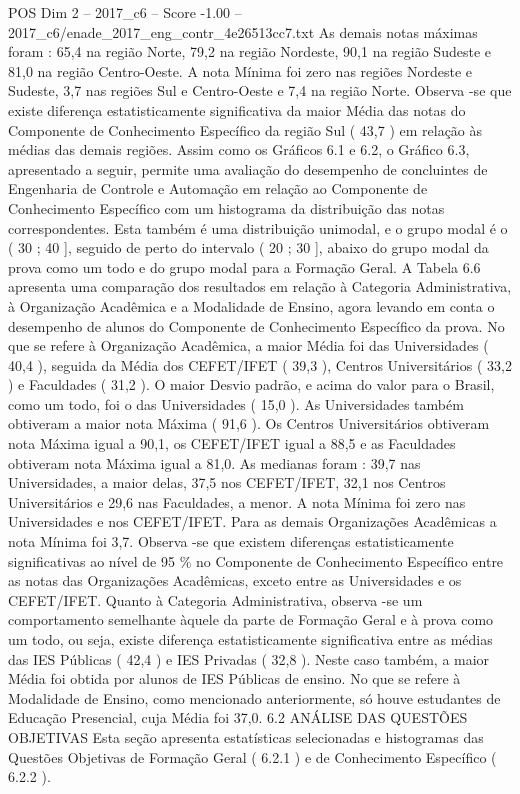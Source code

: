 \begin{textsample}{POS Dim 2 – 2017\_c6 – Score -1.00 – 2017\_c6/enade\_2017\_eng\_contr\_4e26513cc7.txt}
As demais notas máximas foram : 65,4 na região Norte, 79,2 na região Nordeste, 90,1 na região Sudeste e 81,0 na região Centro-Oeste.
A nota Mínima foi zero nas regiões Nordeste e Sudeste, 3,7 nas regiões Sul e Centro-Oeste e 7,4 na região Norte.
Observa -se que existe diferença estatisticamente significativa da maior Média das notas do Componente de Conhecimento Específico da região Sul ( 43,7 ) em relação às médias das demais regiões.
Assim como os Gráficos 6.1 e 6.2, o Gráfico 6.3, apresentado a seguir, permite uma avaliação do desempenho de concluintes de Engenharia de Controle e Automação em relação ao Componente de Conhecimento Específico com um histograma da distribuição das notas correspondentes.
Esta também é uma distribuição unimodal, e o grupo modal é o ( 30 ; 40 ], seguido de perto do intervalo ( 20 ; 30 ], abaixo do grupo modal da prova como um todo e do grupo modal para a Formação Geral.
A Tabela 6.6 apresenta uma comparação dos resultados em relação à Categoria Administrativa, à Organização Acadêmica e a Modalidade de Ensino, agora levando em conta o desempenho de alunos do Componente de Conhecimento Específico da prova.
No que se refere à Organização Acadêmica, a maior Média foi das Universidades ( 40,4 ), seguida da Média dos CEFET/IFET ( 39,3 ), Centros Universitários ( 33,2 ) e Faculdades ( 31,2 ).
O maior Desvio padrão, e acima do valor para o Brasil, como um todo, foi o das Universidades ( 15,0 ).
As Universidades também obtiveram a maior nota Máxima ( 91,6 ).
Os Centros Universitários obtiveram nota Máxima igual a 90,1, os CEFET/IFET igual a 88,5 e as Faculdades obtiveram nota Máxima igual a 81,0.
As medianas foram : 39,7 nas Universidades, a maior delas, 37,5 nos CEFET/IFET, 32,1 nos Centros Universitários e 29,6 nas Faculdades, a menor.
A nota Mínima foi zero nas Universidades e nos CEFET/IFET.
Para as demais Organizações Acadêmicas a nota Mínima foi 3,7.
Observa -se que existem diferenças estatisticamente significativas ao nível de 95 \% no Componente de Conhecimento Específico entre as notas das Organizações Acadêmicas, exceto entre as Universidades e os CEFET/IFET.
Quanto à Categoria Administrativa, observa -se um comportamento semelhante àquele da parte de Formação Geral e à prova como um todo, ou seja, existe diferença estatisticamente significativa entre as médias das IES Públicas ( 42,4 ) e IES Privadas ( 32,8 ).
Neste caso também, a maior Média foi obtida por alunos de IES Públicas de ensino.
No que se refere à Modalidade de Ensino, como mencionado anteriormente, só houve estudantes de Educação Presencial, cuja Média foi 37,0. 6.2 ANÁLISE DAS QUESTÕES OBJETIVAS Esta seção apresenta estatísticas selecionadas e histogramas das Questões Objetivas de Formação Geral ( 6.2.1 ) e de Conhecimento Específico ( 6.2.2 ).

\end{textsample}
